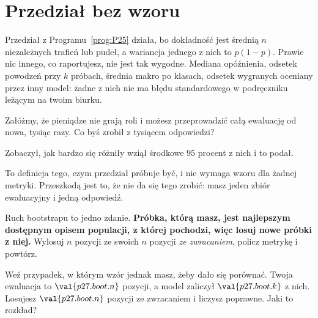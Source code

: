 \section{Przedział bez wzoru}
\label{sec:P27-bootstrap}

\begin{fr}
Przedział z Programu~\ref{prog:P25} działa, bo dokładność jest średnią $n$
niezależnych trafień lub pudeł, a wariancja jednego z nich to $p(1-p)$.
Prawie nic innego, co raportujesz, nie jest tak wygodne. Mediana opóźnienia,
odsetek powodzeń przy $k$ próbach, średnia makro po klasach, odsetek wygranych
oceniany przez inny model: żadne z nich nie ma błędu standardowego w
podręczniku leżącym na twoim biurku.

Załóżmy, że pieniądze nie grają roli i możesz przeprowadzić całą ewaluację od
nowa, tysiąc razy. Co byś zrobił z tysiącem odpowiedzi?
\dotline
\nextframe
\end{fr}

\begin{fr}
\begin{ansblock}
Zobaczył, jak bardzo się różniły \dash{} wziął środkowe $95$ procent z nich i
to podał.
\end{ansblock}

To definicja tego, czym przedział próbuje być, i nie wymaga wzoru dla żadnej
metryki. Przeszkodą jest to, że nie da się tego zrobić: masz jeden zbiór
ewaluacyjny i jedną odpowiedź.

Ruch bootstrapu to jedno zdanie. \textbf{Próbka, którą masz, jest najlepszym
dostępnym opisem populacji, z której pochodzi, więc losuj nowe próbki z
niej.} Wylosuj $n$ pozycji ze swoich $n$ pozycji \emph{ze zwracaniem}, policz
metrykę i powtórz.

Weź przypadek, w którym wzór jednak masz, żeby dało się porównać. Twoja
ewaluacja to $\val{p27.boot.n}$ pozycji, a model zaliczył $\val{p27.boot.k}$ z
nich. Losujesz $\val{p27.boot.n}$ pozycji ze zwracaniem i liczysz poprawne.
Jaki to rozkład?
\dotline
\nextframe
\end{fr}

